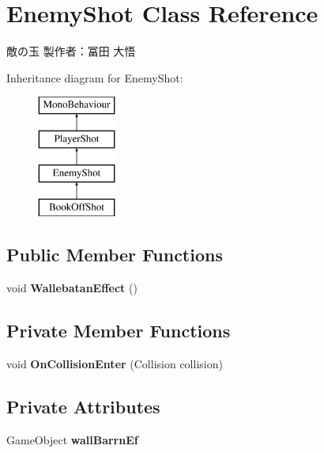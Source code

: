 \hypertarget{class_enemy_shot}{}\section{Enemy\+Shot Class Reference}
\label{class_enemy_shot}


敵の玉 製作者：冨田 大悟  


Inheritance diagram for Enemy\+Shot\+:\begin{figure}[H]
\begin{center}
\leavevmode
\includegraphics[height=4.000000cm]{class_enemy_shot}
\end{center}
\end{figure}
\subsection*{Public Member Functions}
\begin{DoxyCompactItemize}
\item 
\mbox{\label{class_enemy_shot_a858d67382e46efa330f48b24825fbc95}} 
void {\bfseries Wallebatan\+Effect} ()
\end{DoxyCompactItemize}
\subsection*{Private Member Functions}
\begin{DoxyCompactItemize}
\item 
\mbox{\label{class_enemy_shot_ae9a05ceb846818fbb6b8f08ece2f4f47}} 
void {\bfseries On\+Collision\+Enter} (Collision collision)
\end{DoxyCompactItemize}
\subsection*{Private Attributes}
\begin{DoxyCompactItemize}
\item 
\mbox{\label{class_enemy_shot_ad057f1ebfbf5ff0e94643b3f005877e7}} 
Game\+Object {\bfseries wall\+Barrn\+Ef}
\end{DoxyCompactItemize}
